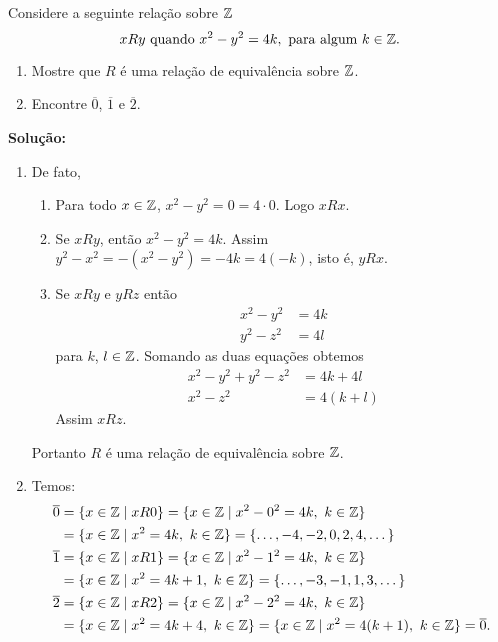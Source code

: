 \documentclass[12pt]{exam}
\begin{document}
\vspace{.5cm}

\questao Considere a seguinte rela\c{c}\~ao sobre $\mathbb{Z}$
\[
	xRy \mbox{ quando } x^2 - y^2 = 4k, \mbox{ para algum } k \in \mathbb{Z}.
\]

\begin{enumerate}[label={\alph*})]
	\item Mostre que $R$ \'e uma rela{\c c}{\~a}o de equival{\^e}ncia sobre $\mathbb{Z}$.
	\item Encontre $\overline{0}$, $\overline{1}$ e $\overline{2}$.
\end{enumerate}

\noindent\textbf{Solu\c{c}\~ao:}
	\begin{enumerate}[label={\alph*})]
		\item De fato,
		\begin{enumerate}[label={\roman*})]
			\item Para todo $x \in \mathbb{Z}$, $x^2 - y^2 = 0 = 4\cdot 0$. Logo $xRx$.
			\item Se $xRy$, ent\~ao $x^2 - y^2 = 4k$. Assim $y^2 - x^2 = -(x^2 - y^2) = -4k = 4(-k)$, isto \'e, $yRx$.
			\item Se $xRy$ e $yRz$ ent\~ao
			\begin{align*}
				x^2 - y^2 &= 4k\\
				y^2 - z^2 &= 4l
			\end{align*}
			para $k$, $l \in \mathbb{Z}$.
			Somando as duas equa\c{c}\~oes obtemos
			\begin{align*}\label{terceira_equacao}
				x^2 - y^2 + y^2 - z^2 &= 4k + 4l\\
				x^2 - z^2 &= 4(k + l)
			\end{align*}
			Assim $xRz$.
		\end{enumerate}

		Portanto $R$ \'e uma rela\c{c}\~ao de equival\^encia sobre $\mathbb{Z}$.

		\item Temos:
		\begin{align*}
			\overline{0} &= \{x \in \mathbb{Z} \mid xR0\} = \{x \in \mathbb{Z} \mid x^2 - 0^2 = 4k,\ k \in \mathbb{Z}\} \\
			&= \{x \in \mathbb{Z} \mid x^2 = 4k, \ k \in \mathbb{Z}\} = \{\dots, -4,-2,0,2,4, \dots\}\\
			\overline{1} &= \{x \in \mathbb{Z} \mid xR1\} = \{x \in \mathbb{Z} \mid x^2 - 1^2 = 4k,\ k \in \mathbb{Z}\} \\
			&= \{x \in \mathbb{Z} \mid x^2 = 4k + 1, \ k \in \mathbb{Z}\} = \{\dots, -3,-1,1,3, \dots\}\\
			\overline{2} &= \{x \in \mathbb{Z} \mid xR2\} = \{x \in \mathbb{Z} \mid x^2 - 2^2 = 4k,\ k \in \mathbb{Z}\} \\
			&= \{x \in \mathbb{Z} \mid x^2 = 4k + 4, \ k \in \mathbb{Z}\} = \{x \in \mathbb{Z} \mid x^2 = 4(k + 1), \ k \in \mathbb{Z}\} = \overline{0}.
		\end{align*}
	\end{enumerate}
\end{document}
